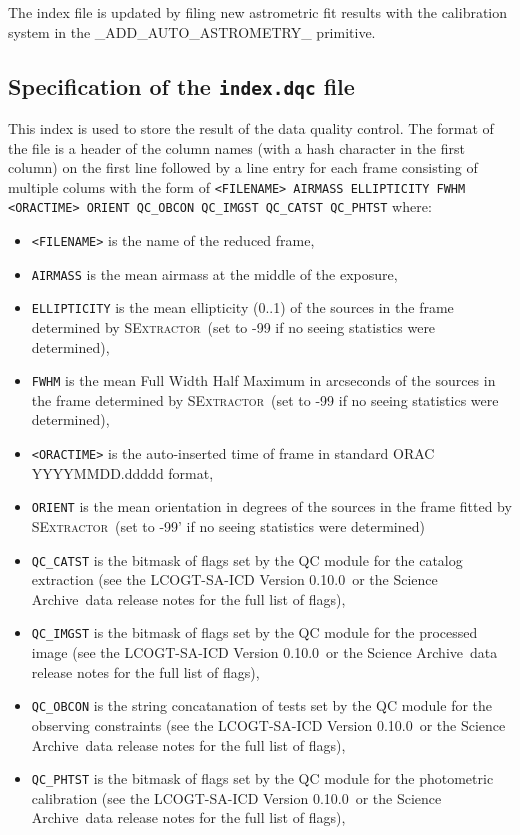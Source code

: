 \documentclass[twoside,11pt,nolof]{starlink}
\providecommand{\SEx}{\textsc{SExtractor}}
\providecommand{\task}[1]{\textsf{#1}}
\providecommand{\SAICD}{LCOGT-SA-ICD Version 0.10.0}
\providecommand{\SA}{Science Archive}
\begin{document}
The index file is updated by filing new astrometric fit results with the
calibration system in the \task{\_ADD\_AUTO\_ASTROMETRY\_} primitive.

\subsection{Specification of the \texttt{index.dqc} file\label{ap:index.dqc}}

This index is used to store the result of the data quality control. The format of the file is a header of the column names (with a hash
character in the first column) on the first line followed by a line entry for
each frame consisting of multiple colums with the form of \texttt{<FILENAME>
AIRMASS ELLIPTICITY FWHM <ORACTIME> ORIENT QC\_OBCON QC\_IMGST QC\_CATST QC\_PHTST} where:
\begin{itemize}
\item \texttt{<FILENAME>} is the name of the reduced frame, 
\item \texttt{AIRMASS} is the mean airmass at the middle of the exposure, 
\item \texttt{ELLIPTICITY} is the mean ellipticity (0..1) of the sources in the
frame determined by \SEx\  (set to -99 if no seeing statistics were determined), 
\item \texttt{FWHM} is the mean Full Width Half Maximum in arcseconds of the
sources in the frame determined by \SEx\  (set to -99 if no seeing statistics were determined),
\item \texttt{<ORACTIME>} is the auto-inserted time of frame in standard ORAC
YYYYMMDD.ddddd format,
\item \texttt{ORIENT} is the mean orientation in degrees of the sources in the
frame fitted by \SEx\  (set to -99' if no seeing statistics were determined)
\item \texttt{QC\_CATST} is the bitmask of flags set by the QC module for the
catalog extraction (see the \SAICD\ or the \SA\ data release notes for the full
list of flags),
\item \texttt{QC\_IMGST} is the bitmask of flags set by the QC module for the
processed image (see the \SAICD\ or the \SA\ data release notes for the full
list of flags),
\item \texttt{QC\_OBCON} is the string concatanation of tests set by the QC
module for the observing constraints (see the \SAICD\ or the \SA\ data release
notes for the full list of flags),
\item \texttt{QC\_PHTST} is the bitmask of flags set by the QC module for the
photometric calibration (see the \SAICD\ or the \SA\ data release notes for the full
list of flags),
\end{itemize}
\end{document}
